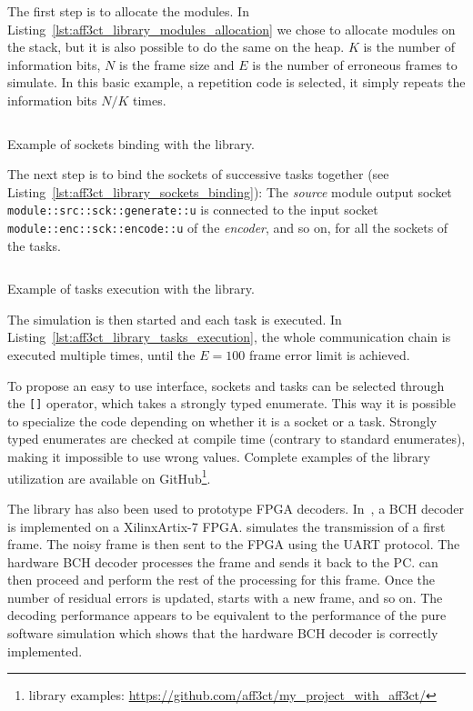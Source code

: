 The first step is to allocate the modules. In
Listing~\ref{lst:aff3ct_library_modules_allocation} we chose to allocate modules
on the stack, but it is also possible to do the same on the heap. $K$ is the
number of information bits, $N$ is the frame size and $E$ is the number of
erroneous frames to simulate. In this basic example, a repetition code is
selected, it simply repeats the information bits $N/K$ times.

\begin{listing}[htp]
  \inputminted[frame=lines,linenos]{C++}{main/chapter4/src/use_cases/library/sockets_binding.cpp}
  \caption{Example of sockets binding with the \AFFECT library.}
  \label{lst:aff3ct_library_sockets_binding}
\end{listing}

The next step is to bind the sockets of successive tasks together (see
Listing~\ref{lst:aff3ct_library_sockets_binding}): The \textit{source} module
output socket \verb|module::src::sck::generate::u| is connected to the input
socket \verb|module::enc::sck::encode::u| of the \textit{encoder}, and so
on, for all the sockets of the tasks.

\begin{listing}[htp]
  \inputminted[frame=lines,linenos]{C++}{main/chapter4/src/use_cases/library/tasks_execution.cpp}
  \caption{Example of tasks execution with the \AFFECT library.}
  \label{lst:aff3ct_library_tasks_execution}
\end{listing}

The simulation is then started and each task is executed. In
Listing~\ref{lst:aff3ct_library_tasks_execution}, the whole communication chain
is executed multiple times, until the $E = 100$ frame error limit is achieved.

To propose an easy to use interface, sockets and tasks can be selected through
the \verb|[]| operator, which takes a \Cxx strongly typed enumerate. This way it
is possible to specialize the code depending on whether it is a socket or a
task. Strongly typed enumerates are checked at compile time (contrary to
standard enumerates), making it impossible to use wrong values. Complete
examples of the \AFFECT library utilization are available on
GitHub\footnote{\AFFECT library examples: \url{https://github.com/aff3ct/my_project_with_aff3ct/}}.

The \AFFECT library has also been used to prototype FPGA decoders.
In~\cite{Cassagne2017a}, a BCH decoder is implemented on a Xilinx\R Artix-7
FPGA. \AFFECT simulates the transmission of a first frame. The noisy frame is
then sent to the FPGA using the UART protocol. The hardware BCH decoder
processes the frame and sends it back to the PC. \AFFECT can then proceed and
perform the rest of the processing for this frame. Once the number of residual
errors is updated, \AFFECT starts with a new frame, and so on. The decoding
performance appears to be equivalent to the performance of the pure software
simulation which shows that the hardware BCH decoder is correctly implemented.

